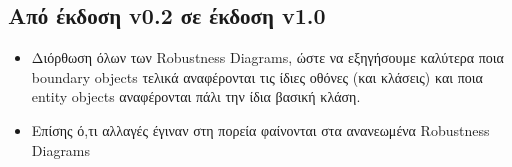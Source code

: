 \documentclass[12pt,a4paper]{article}
\begin{document}
\subsection{Από έκδοση v0.2 σε έκδοση v1.0}
\begin{itemize}
    \item Διόρθωση όλων των Robustness Diagrams, ώστε να εξηγήσουμε καλύτερα ποια boundary objects τελικά αναφέρονται τις ίδιες οθόνες (και κλάσεις) και ποια entity objects αναφέρονται πάλι την ίδια βασική κλάση.
    \item Επίσης ό,τι αλλαγές έγιναν στη πορεία φαίνονται στα ανανεωμένα Robustness Diagrams
\end{itemize}
\end{document}
